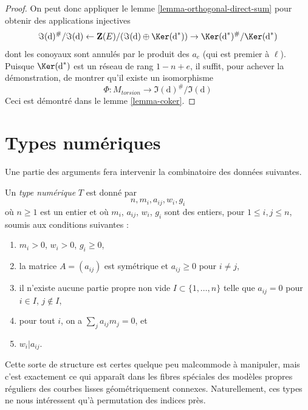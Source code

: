 \begin{proof}
\medskip\noindent
On peut donc appliquer le lemme \ref{lemma-orthogonal-direct-sum}
pour obtenir des applications injectives
$$
\Im(\text{d})^\#/\Im(\text{d}) \leftarrow
\mathbf{Z}(E)/(\Im(\text{d}) \oplus \Ker(\text{d}^*)) \rightarrow
\Ker(\text{d}^*)^\#/\Ker(\text{d}^*)
$$
dont les conoyaux sont annulés par le produit des $a_e$
(qui est premier à $\ell$). Puisque $\Ker(\text{d}^*)$ est
un réseau de rang $1 - n + e$, il suffit, pour achever la démonstration,
de montrer qu'il existe un isomorphisme
$$
\Phi : M_{torsion} \longrightarrow \Im(\text{d})^\#/\Im(\text{d})
$$
Ceci est démontré dans le lemme \ref{lemma-coker}.
\end{proof}









\section{Types numériques}
\label{section-numerical-types}

\noindent
Une partie des arguments fera intervenir la combinatoire des données suivantes.

\begin{definition}
\label{definition-type}
Un {\it type numérique} $T$ est donné par
$$
n, m_i, a_{ij}, w_i, g_i
$$
où $n \geq 1$ est un entier et où $m_i$, $a_{ij}$, $w_i$, $g_i$
sont des entiers, pour $1 \leq i, j \leq n$, soumis aux conditions suivantes :
\begin{enumerate}
\item $m_i > 0$, $w_i > 0$, $g_i \geq 0$,
\item la matrice $A = (a_{ij})$ est symétrique et $a_{ij} \geq 0$
pour $i \not = j$,
\item il n'existe aucune partie propre non vide $I \subset \{1, \ldots, n\}$
telle que $a_{ij} = 0$ pour $i \in I$, $j \not \in I$,
\item pour tout $i$, on a $\sum_j a_{ij}m_j = 0$, et
\item $w_i | a_{ij}$.
\end{enumerate}
\end{definition}

\noindent
Cette sorte de structure est certes quelque peu malcommode à manipuler,
mais c'est exactement ce qui apparaît dans les fibres spéciales des modèles
propres réguliers des courbes lisses géométriquement connexes.
Naturellement, ces types ne nous intéressent qu'à permutation des indices près.

